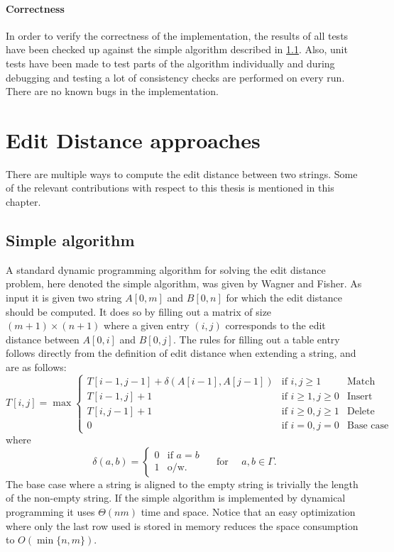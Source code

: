 \documentclass[twoside,11pt,openright]{report}
\newcommand{\str}[3]{#1[#2, #3]}
\begin{document}
\subsubsection{Correctness}
In order to verify the correctness of the implementation, the results of all tests have been checked up against the simple algorithm described in \cref{sec:intro:simple}. Also, unit tests have been made to test parts of the algorithm individually and during debugging and testing a lot of consistency checks are performed on every run. There are no known bugs in the implementation.

\chapter{Edit Distance approaches}
There are multiple ways to compute the edit distance between two strings. Some of the relevant contributions with respect to this thesis is mentioned in this chapter.

\section{Simple algorithm}
\label{sec:intro:simple}
A standard dynamic programming algorithm for solving the edit distance problem, here denoted the simple algorithm, was given by Wagner and Fisher. As input it is given two string $\str{A}{0}{m}$ and $\str{B}{0}{n}$ for which the edit distance should be computed. It does so by filling out a matrix of size $(m + 1) \times (n + 1)$ where a given entry $(i, j)$ corresponds to the edit distance between $\str{A}{0}{i}$ and $\str{B}{0}{j}$. The rules for filling out a table entry follows directly from the definition of edit distance when extending a string, and are as follows:
\[
  T[i, j] = \max \left\{ \begin{array}{lll}
              T[i - 1, j - 1] + \delta(A[i - 1], A[j - 1]) & \text{if } i, j \geq 1 & \text{Match} \\
              T[i - 1, j] + 1       & \text{if } i \geq 1, j \geq 0       & \text{Insert} \\
              T[i, j - 1] + 1       & \text{if } i \geq 0, j \geq 1       & \text{Delete} \\
              0                     & \text{if } i = 0, j = 0             & \text{Base case}
            \end{array} \right.
\]
where
\[
  \delta(a, b) = \begin{cases}
                   0 & \text{if } a = b \\
                   1 & \text{o/w.}
                 \end{cases}
    \quad \text{ for } \quad a, b \in \Gamma.
\]
The base case where a string is aligned to the empty string is trivially the length of the non-empty string. If the simple algorithm is implemented by dynamical programming it uses $\Theta(nm)$ time and space. Notice that an easy optimization where only the last row used is stored in memory reduces the space consumption to $O(\min\{n, m\})$.
\end{document}
